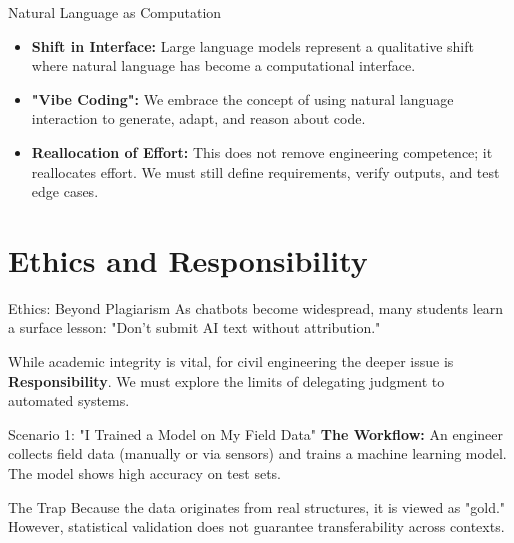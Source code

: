 \documentclass[german,10pt]{beamer}
\begin{document}
\begin{frame}{Natural Language as Computation}
    \justifying
    \begin{itemize}
        \item \textbf{Shift in Interface:} Large language models represent a qualitative shift where natural language has become a computational interface.
        \item \textbf{"Vibe Coding":} We embrace the concept of using natural language interaction to generate, adapt, and reason about code.
        \item \textbf{Reallocation of Effort:} This does not remove engineering competence; it reallocates effort. We must still define requirements, verify outputs, and test edge cases.
    \end{itemize}
\end{frame}

\section{Ethics and Responsibility}

\begin{frame}{Ethics: Beyond Plagiarism}
    \justifying
    As chatbots become widespread, many students learn a surface lesson: "Don't submit AI text without attribution."
    
    \vspace{1em}
    While academic integrity is vital, for civil engineering the deeper issue is \textbf{Responsibility}. We must explore the limits of delegating judgment to automated systems.
\end{frame}

\begin{frame}{Scenario 1: "I Trained a Model on My Field Data"}
    \justifying
    \textbf{The Workflow:}
    An engineer collects field data (manually or via sensors) and trains a machine learning model. The model shows high accuracy on test sets.
    
    \vspace{1em}
    \begin{warningbox}{The Trap}
    Because the data originates from real structures, it is viewed as "gold." However, statistical validation does not guarantee transferability across contexts.
    \end{warningbox}
\end{frame}
\end{document}
